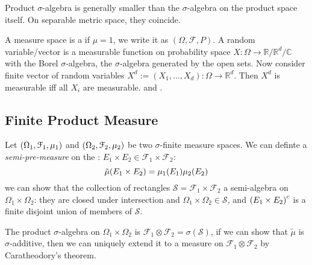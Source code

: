 \begin{proposition}
    Product \(\sigma\)-algebra is generally smaller than the \(\sigma\)-algebra on the product space itself. On separable metric space, they coincide. 
\end{proposition}

A measure space is a  if \(\mu =1\), we write it as \((\Omega, \mathcal{F}, P)\). A random variable/vector is a measurable function on probability space \(X: \Omega \to \mathbb{R}/\mathbb{R}^{d}/\mathbb{C}\) with the Borel \(\sigma\)-algebra, the \(\sigma\)-algebra generated by the open sets.
{}
Now consider finite vector of random variables \(X^{d} := (X_{1}, \dots,X_{d}) : \Omega \to \mathbb{R}^{d}\). Then \(X^{d}\) is measurable iff all \(X_{i}\) are measurable. 
 and . 

\subsection{Finite Product Measure}

Let \(\pqty{\Omega_{1}, \mathcal{F}_{1}, \mu_{1}}\) and \(\pqty{\Omega_{2}, \mathcal{F}_{2} , \mu_{2}}\) be two \(\sigma\)-finite measure spaces. We can definte a \textit{semi-pre-measure} on the : \(E_{1}\times E_{2} \in \mathcal{F}_{1} \times \mathcal{F}_{2}\):
\begin{equation*}
    \tilde{\mu} \pqty{E_{1} \times E_{2}} = \mu_{1} \pqty{E_{1}} \mu_{2} \pqty{E_{2}}
\end{equation*}
we can show that the collection of rectangles \(\mathcal{S} = \mathcal{F}_{1}\times \mathcal{F}_{2}\) a semi-algebra  on \(\Omega_{1}\times \Omega_{2}\): they are closed under intersection and \(\Omega_{1} \times \Omega_{2} \in \mathcal{S}\), and \(\pqty{E_{1}\times E_{2}}^{c}\) is a finite disjoint union of members of \(\mathcal{S}\). 

The product \(\sigma\)-algebra on \(\Omega_{1}\times \Omega_{2}\) is \(\mathcal{F}_{1} \otimes \mathcal{F}_{2} = \sigma(\mathcal{S})\), if we can show that \(\tilde{\mu}\) is \(\sigma\)-additive, then we can uniquely extend it to a measure on \(\mathcal{F}_{1} \otimes \mathcal{F}_{2}\) by Caratheodory's theorem. 

